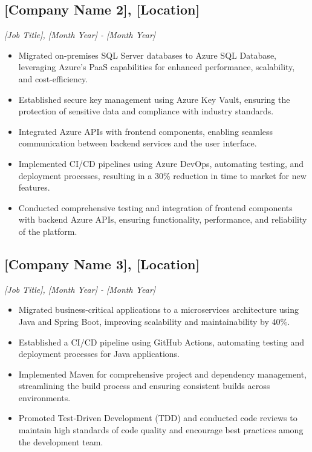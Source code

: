 \documentclass[a4paper,10pt]{article}
\begin{document}
\subsection*{[Company Name 2], [Location]}
\textit{[Job Title], [Month Year] - [Month Year]}
\begin{itemize}[noitemsep]
\item Migrated on-premises SQL Server databases to Azure SQL Database, leveraging Azure's PaaS capabilities for enhanced performance, scalability, and cost-efficiency.
\item Established secure key management using Azure Key Vault, ensuring the protection of sensitive data and compliance with industry standards.
\item Integrated Azure APIs with frontend components, enabling seamless communication between backend services and the user interface.
\item Implemented CI/CD pipelines using Azure DevOps, automating testing, and deployment processes, resulting in a 30\% reduction in time to market for new features.
\item Conducted comprehensive testing and integration of frontend components with backend Azure APIs, ensuring functionality, performance, and reliability of the platform.
\end{itemize}

\subsection*{[Company Name 3], [Location]}
\textit{[Job Title], [Month Year] - [Month Year]}
\begin{itemize}[noitemsep]
\item Migrated business-critical applications to a microservices architecture using Java and Spring Boot, improving scalability and maintainability by 40\%.
\item Established a CI/CD pipeline using GitHub Actions, automating testing and deployment processes for Java applications.
\item Implemented Maven for comprehensive project and dependency management, streamlining the build process and ensuring consistent builds across environments.
\item Promoted Test-Driven Development (TDD) and conducted code reviews to maintain high standards of code quality and encourage best practices among the development team.
\end{itemize}
\end{document}
